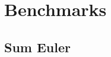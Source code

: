 \chapter{Benchmarks}
\label{ch:Benchmarks}







\vspace{3mm}
\begin{spacing}{1} 

\end{spacing}



\section{Sum Euler}
\label{se:sumEuler_benchmark_imp}

\vspace{3mm}
\begin{spacing}{1} 

\end{spacing}
